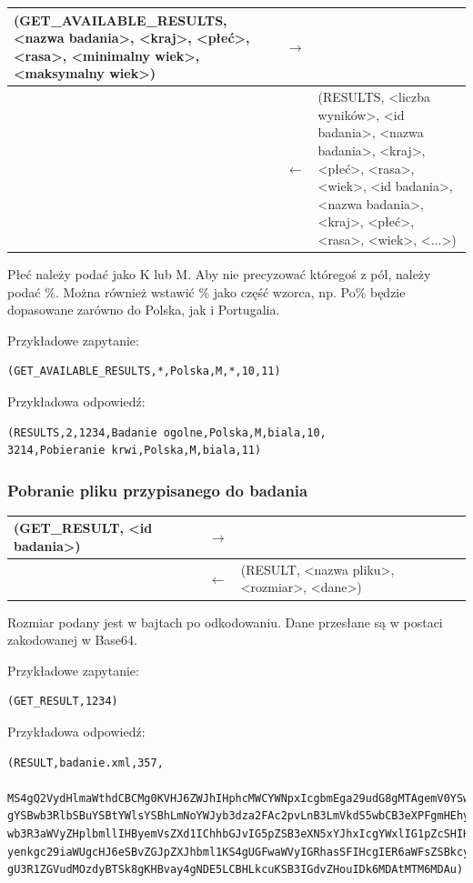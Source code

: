 \begin{longtable}{| p{} | p{}| p{} |} 
\hline
(GET\_AVAILABLE\_RESULTS, <nazwa badania>, <kraj>, <płeć>, <rasa>, <minimalny wiek>, <maksymalny wiek>) & $\rightarrow$ &  \\ \hline
 & $\leftarrow$ & (RESULTS, <liczba wyników>, <id badania>, <nazwa badania>, <kraj>, <płeć>, <rasa>, <wiek>, <id badania>, <nazwa badania>, <kraj>, <płeć>, <rasa>, <wiek>, <...>) \\ \hline
\end{longtable}

Płeć należy podać jako K lub M.
Aby nie precyzować któregoś z pól, należy podać \%. Można również wstawić \% jako część wzorca, np. Po\% będzie dopasowane zarówno do Polska, jak i Portugalia.

Przykładowe zapytanie:
\begin{lstlisting}[style=incode]
(GET_AVAILABLE_RESULTS,*,Polska,M,*,10,11)
\end{lstlisting}
Przykładowa odpowiedź:
\begin{lstlisting}[style=incode]
(RESULTS,2,1234,Badanie ogolne,Polska,M,biala,10,
3214,Pobieranie krwi,Polska,M,biala,11)
\end{lstlisting}

\subsubsection{Pobranie pliku przypisanego do badania}

\begin{longtable}{| p{} | p{}| p{} |} 
\hline
(GET\_RESULT, <id badania>) & $\rightarrow$ &  \\ \hline
 & $\leftarrow$ & (RESULT, <nazwa pliku>, <rozmiar>, <dane>) \\ \hline
\end{longtable}

Rozmiar podany jest w bajtach po odkodowaniu.
Dane przesłane są w postaci zakodowanej w Base64.

Przykładowe zapytanie:
\begin{lstlisting}[style=incode]
(GET_RESULT,1234)
\end{lstlisting}
Przykładowa odpowiedź:
\begin{lstlisting}[style=incode]
(RESULT,badanie.xml,357,
 MS4gQ2VydHlmaWthdCBCMg0KVHJ6ZWJhIHphcMWCYWNpxIcgbmEga29udG8gMTAgemV0YSw
gYSBwb3RlbSBuYSBtYWlsYSBhLmNoYWJyb3dza2FAc2pvLnB3LmVkdS5wbCB3eXPFgmHEhyB
wb3R3aWVyZHplbmllIHByemVsZXd1IChhbGJvIG5pZSB3eXN5xYJhxIcgYWxlIG1pZcSHIHB
yenkgc29iaWUgcHJ6eSBvZGJpZXJhbml1KS4gUGFwaWVyIGRhasSFIHcgIER6aWFsZSBkcy4
gU3R1ZGVudMOzdyBTSk8gKHBvay4gNDE5LCBHLkcuKSB3IGdvZHouIDk6MDAtMTM6MDAu)
\end{lstlisting}


